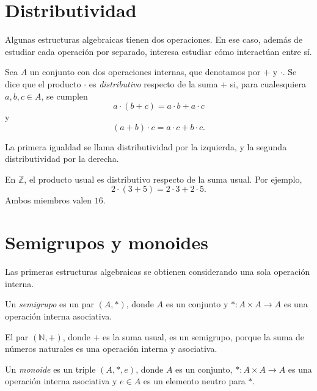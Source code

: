 \section{Distributividad}

Algunas estructuras algebraicas tienen dos operaciones. En ese caso, además de estudiar cada operación por separado, interesa estudiar cómo interactúan entre sí.

\begin{definicion}[Distributividad]
Sea \(A\) un conjunto con dos operaciones internas, que denotamos por \(+\) y \(\cdot\). Se dice que el producto \(\cdot\) es \emph{distributivo} respecto de la suma \(+\) si, para cualesquiera \(a,b,c\in A\), se cumplen
\[
  a\cdot (b+c)=a\cdot b+a\cdot c
\]
y
\[
  (a+b)\cdot c=a\cdot c+b\cdot c.
\]
\end{definicion}

La primera igualdad se llama distributividad por la izquierda, y la segunda distributividad por la derecha.

\begin{ejemplo}
En \(\mathbb{Z}\), el producto usual es distributivo respecto de la suma usual. Por ejemplo,
\[
  2\cdot(3+5)=2\cdot 3+2\cdot 5.
\]
Ambos miembros valen \(16\).
\end{ejemplo}

\section{Semigrupos y monoides}

Las primeras estructuras algebraicas se obtienen considerando una sola operación interna.

\begin{definicion}[Semigrupo]
Un \emph{semigrupo} es un par \((A,*)\), donde \(A\) es un conjunto y \(*:A\times A\to A\) es una operación interna asociativa.
\end{definicion}

\begin{ejemplo}
El par \((\mathbb{N},+)\), donde \(+\) es la suma usual, es un semigrupo, porque la suma de números naturales es una operación interna y asociativa.
\end{ejemplo}

\begin{definicion}[Monoide]
Un \emph{monoide} es un triple \((A,*,e)\), donde \(A\) es un conjunto, \(*:A\times A\to A\) es una operación interna asociativa y \(e\in A\) es un elemento neutro para \(*\).
\end{definicion}

